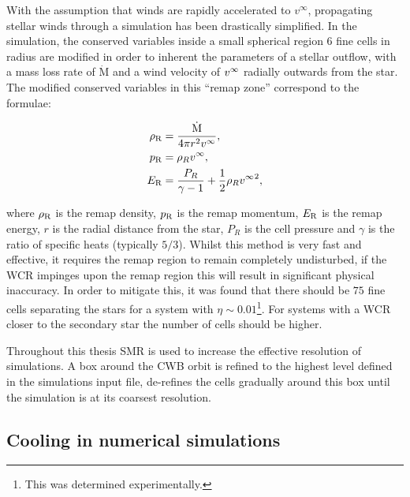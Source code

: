 With the assumption that winds are rapidly accelerated to $v^\infty$, propagating stellar winds through a simulation has been drastically simplified.
In the simulation, the conserved variables inside a small spherical region 6 fine cells in radius are modified in order to inherent the parameters of a stellar outflow, with a mass loss rate of $\dot{\text{M}}$ and a wind velocity of $v^\infty$ radially outwards from the star.
The modified conserved variables in this ``remap zone'' correspond to the formulae:

\begin{subequations}
  \label{eq:ch3remapzones}
  \begin{align}
    \rho_\text{R} &= \frac{\dot{\text{M}}}{4 \pi r^2 v^\infty}, \\
    p_\text{R}    &= \rho_R v^\infty, \\
    E_\text{R}    &= \frac{P_R}{\gamma - 1} + \frac{1}{2} \rho_R {v^\infty}^2,
  \end{align}
\end{subequations}

\noindent
where $\rho_\text{R}$ is the remap density, $p_\text{R}$ is the remap momentum, $E_\text{R}$ is the remap energy, $r$ is the radial distance from the star, $P_R$ is the cell pressure and $\gamma$ is the ratio of specific heats (typically $5/3$).
Whilst this method is very fast and effective, it requires the remap region to remain completely undisturbed, if the WCR impinges upon the remap region this will result in significant physical inaccuracy.
In order to mitigate this, it was found that there should be $75$ fine cells separating the stars for a system with $\eta\sim 0.01$\footnote{This was determined experimentally.}.
For systems with a WCR closer to the secondary star the number of cells should be higher.
 
Throughout this thesis SMR is used to increase the effective resolution of simulations.
A box around the CWB orbit is refined to the highest level defined in the simulations input file, \athena{} de-refines the cells gradually around this box until the simulation is at its coarsest resolution.

\subsection{Cooling in numerical simulations}


